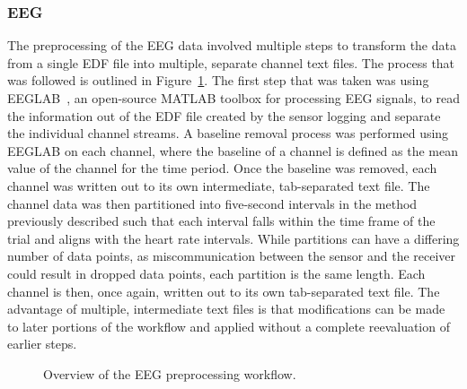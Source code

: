\documentclass[11pt]{article}
\begin{document}
		\subsubsection{EEG}
		The preprocessing of the EEG data involved multiple steps to transform the data from a single EDF file into multiple, separate channel text files. The process that was followed is outlined in Figure~\ref{fig:eeg-preprocessing}. The first step that was taken was using EEGLAB~\cite{}, an open-source MATLAB toolbox for processing EEG signals, to read the information out of the EDF file created by the sensor logging and separate the individual channel streams. A baseline removal process was performed using EEGLAB on each channel, where the baseline of a channel is defined as the mean value of the channel for the time period. Once the baseline was removed, each channel was written out to its own intermediate, tab-separated text file. The channel data was then partitioned into five-second intervals in the method previously described such that each interval falls within the time frame of the trial and aligns with the heart rate intervals. While partitions can have a differing number of data points, as miscommunication between the sensor and the receiver could result in dropped data points, each partition is the same length. Each channel is then, once again, written out to its own tab-separated text file. The advantage of multiple, intermediate text files is that modifications can be made to later portions of the workflow and applied without a complete reevaluation of earlier steps.
		\begin{figure}
		\centering

		\caption{Overview of the EEG preprocessing workflow.}
		\label{fig:eeg-preprocessing}
		\end{figure} 
			
\end{document}

